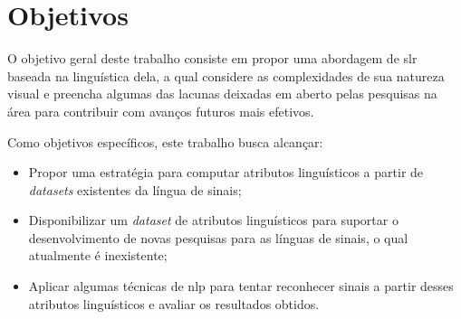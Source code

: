 \section{Objetivos}
\label{sec:introducao-objetivos}

O objetivo geral deste trabalho consiste em propor uma abordagem de \acrlong{slr} baseada na linguística dela, a qual considere as complexidades de sua natureza visual e preencha algumas das lacunas deixadas em aberto pelas pesquisas na área para contribuir com avanços futuros mais efetivos.



Como objetivos específicos, este trabalho busca alcançar:


\begin{itemize}
    \item Propor uma estratégia para computar atributos linguísticos a partir de \textit{datasets} existentes da língua de sinais;
    \item Disponibilizar um \textit{dataset} de atributos linguísticos para suportar o desenvolvimento de novas pesquisas para as línguas de sinais, o qual atualmente é inexistente;
    \item Aplicar algumas técnicas de \acrlong{nlp} para tentar reconhecer sinais a partir desses atributos linguísticos e avaliar os resultados obtidos.
\end{itemize}


